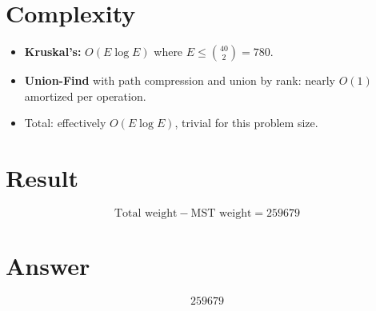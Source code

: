 \documentclass[12pt,a4paper]{article}
\theoremstyle{definition}
\begin{document}
\section{Complexity}

\begin{itemize}
    \item \textbf{Kruskal's:} $O(E \log E)$ where $E \leq \binom{40}{2} = 780$.
    \item \textbf{Union-Find} with path compression and union by rank: nearly $O(1)$ amortized per operation.
    \item Total: effectively $O(E \log E)$, trivial for this problem size.
\end{itemize}

\section{Result}

\[
\text{Total weight} - \text{MST weight} = \boxed{259679}
\]

\section{Answer}

\[
\boxed{259679}
\]
\end{document}

